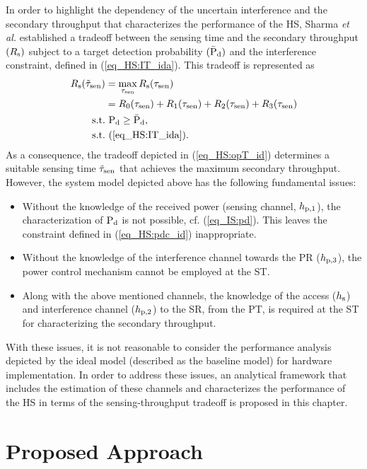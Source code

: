 In order to highlight the dependency of the uncertain interference and the secondary throughput that characterizes the performance of the HS, Sharma \textit{et al.} \cite{Sharma14} established a tradeoff between the sensing time and the secondary throughput $(R_{\text{s}})$ subject to a target detection probability $(\bar{\text{P}}_{\text{d}})$ and the interference constraint, defined in (\ref{eq_HS:IT_ida}). This tradeoff is represented as
\begin{align}
R_{\text{s}}(\tilde{\tau}_{\text{sen}}) &= \operatorname*{max}_{\tau_{\text{sen}}} R_{\text{s}}(\tau_{\text{sen}}) \label{eq_HS:opT_id}\\ 
\quad &= R_{\text{0}}(\tau_{\text{sen}}) + R_{\text{1}}(\tau_{\text{sen}}) + R_{\text{2}}(\tau_{\text{sen}}) + R_{\text{3}}(\tau_{\text{sen}}) \nonumber  \\
\text{s.t.} & \text{ } \text{P}_{\text{d}} \ge \bar{\text{P}}_{\text{d}}, \label{eq_HS:pdc_id} \\ 
\text{s.t.} & \text{ } (\ref{eq_HS:IT_ida}). \nonumber
\end{align}
As a consequence, the tradeoff depicted in (\ref{eq_HS:opT_id}) determines a suitable sensing time $\tilde{\tau}_{\text{sen}}$ that achieves the maximum secondary throughput.
However, the system model depicted above has the following fundamental issues:
\begin{itemize}
\item Without the knowledge of the received power (sensing channel, $h_{\text{p,1}}$), the characterization of $\text{P}_{\text{d}}$ is not possible, cf. (\ref{eq_IS:pd}). This leaves the constraint defined in (\ref{eq_HS:pdc_id}) inappropriate. 
\item Without the knowledge of the interference channel towards the PR ($h_{\text{p,3}}$), the power control mechanism cannot be employed at the ST.
\item Along with the above mentioned channels, the knowledge of the access ($h_{\text{s}}$) and interference channel ($h_{\text{p,2}}$) to the SR, from the PT, is required at the ST for characterizing the secondary throughput. 
\end{itemize} 
With these issues, it is not reasonable to consider the performance analysis depicted by the ideal model (described as the baseline model) for hardware implementation. In order to address these issues, an analytical framework that includes the estimation of these channels and characterizes the performance of the HS in terms of the sensing-throughput tradeoff is proposed in this chapter. 
\section{Proposed Approach} \label{sec_HS:pm}
